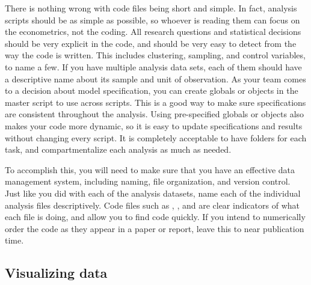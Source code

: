 There is nothing wrong with code files being short and simple.
In fact, analysis scripts should be as simple as possible,
so whoever is reading them can focus on the econometrics, not the coding.
All research questions and statistical decisions should be very explicit in the code,
and should be very easy to detect from the way the code is written.
This includes clustering, sampling, and control variables, to name a few.
If you have multiple analysis data sets,
each of them should have a descriptive name about its sample and unit of observation.
As your team comes to a decision about model specification,
you can create globals or objects in the master script to use across scripts.
This is a good way to make sure specifications are consistent throughout the analysis.
Using pre-specified globals or objects also makes your code more dynamic,
so it is easy to update specifications and results without changing every script.
It is completely acceptable to have folders for each task,
and compartmentalize each analysis as much as needed.

To accomplish this, you will need to make sure that you have an effective data management system,
including naming, file organization, and version control.
Just like you did with each of the analysis datasets,
name each of the individual analysis files descriptively.
Code files such as ,
, and 
are clear indicators of what each file is doing, and allow you to find code quickly.
If you intend to numerically order the code as they appear in a paper or report,
leave this to near publication time.

\subsection{Visualizing data}

